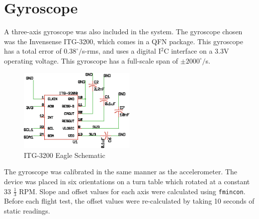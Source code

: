 \section{Gyroscope}
A three-axis gyroscope was also included in the system. The gyroscope chosen was the Invensense ITG-3200, which comes in a QFN package. This gyroscope has a total error of $0.38^\circ/$s-rms\cite{itg3200DataSheet}, and uses a digital I$^2$C interface on a 3.3V operating voltage. This gyroscope has a full-scale span of $\pm2000^\circ/$s.

\begin{figure}[H]

  \centering
    \includegraphics[width=0.5\textwidth]{figures/itg3200Schematic.eps}
      \caption{ITG-3200 Eagle Schematic} \label{itg3200Schematic}
\end{figure}

The gyroscope was calibrated in the same manner as the accelerometer. The device was placed in six orientations on a turn table which rotated at a constant 33 $\frac{1}{3}$ RPM. Slope and offset values for each axis were calculated using \texttt{fmincon}. Before each flight test, the offset values were re-calculated by taking 10 seconds of static readings.\\

